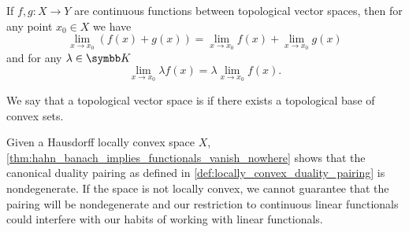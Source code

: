 \begin{corollary}\label{thm:linearity_of_function_limits}
  If \( f, g: X \to Y \) are continuous functions between topological vector spaces, then for any point \( x_0 \in X \) we have
  \begin{equation*}
    \lim_{x \to x_0} (f(x) + g(x)) = \lim_{x \to x_0} f(x) + \lim_{x \to x_0} g(x)
  \end{equation*}
  and for any \( \lambda \in \K \)
  \begin{equation*}
    \lim_{x \to x_0} \lambda f(x) = \lambda \lim_{x \to x_0} f(x).
  \end{equation*}
\end{corollary}

\begin{definition}\label{def:locally_convex_space}\cite[1.8]{Rudin1991}
  We say that a topological vector space is  if there exists a topological base of convex sets.
\end{definition}

\begin{remark}\label{def:locally_convex_duality_pairing}
  Given a Hausdorff locally convex space \( X \), \cref{thm:hahn_banach_implies_functionals_vanish_nowhere} shows that the canonical duality pairing as defined in \cref{def:locally_convex_duality_pairing} is nondegenerate. If the space is not locally convex, we cannot guarantee that the pairing will be nondegenerate and our restriction to continuous linear functionals could interfere with our habits of working with linear functionals.
\end{remark}
